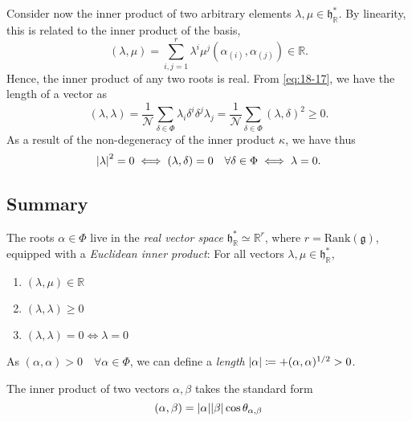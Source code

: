 Consider now the inner product of two arbitrary elements $\lambda, \mu \in \mathfrak{h}^*_{\mathbb{R}}$.
By linearity, this is related to the inner product of the basis,
\begin{equation}
  (\lambda ,\mu) = \sum_{i, j =1}^{r} \lambda^{i} \mu^{j} (\alpha_{(i)}, \alpha_{(j)}) \in \mathbb{R}.
\end{equation}
Hence, the inner product of any two roots is real.
From \eqref{eq:18-17}, we have the length of a vector as
\begin{equation}
  (\lambda, \lambda) = \frac{1}{\mathcal{N}} \sum_{\delta \in \Phi} \lambda_{i} \delta^{i} \delta^{j} \lambda_{j} = \frac{1}{\mathcal{N}} \sum_{\delta \in \Phi} (\lambda, \delta)^2 \geq 0.
\end{equation}
As a result of the non-degeneracy of the inner product $\kappa$, we have thus
\begin{equation}
  \abs{\lambda}^2 = 0 \iff (\lambda, \delta) = 0 \quad \forall \delta \in \Phi \iff \lambda = 0.
\end{equation}

\subsection*{Summary}%

The roots $\alpha \in \Phi$ live in the \emph{real vector space} $\mathfrak{h}^*_{\mathbb{R}} \simeq \mathbb{R}^r$, where $r = \text{Rank}(\mathfrak{g})$, equipped with a \emph{Euclidean inner product}:
For all vectors $\lambda, \mu \in \mathfrak{h}^*_{\mathbb{R}}$, 
\begin{enumerate}
  \item $(\lambda, \mu) \in \mathbb{R}$ 
  \item $(\lambda, \lambda) \geq 0$ 
  \item $(\lambda,  \lambda) = 0 \iff \lambda = 0$
\end{enumerate}

\begin{wrapfigure}{R}{0.3\columnwidth}
  \centering
  \def\svgwidth{0.25\columnwidth}
  
  \caption{}
  \label{fig:l18f1}
\end{wrapfigure}

\begin{definition}[]
  As $(\alpha, \alpha) > 0 \quad \forall \alpha \in \Phi$, we can define a \emph{length} $\abs{\alpha} \coloneqq + (\alpha, \alpha)^{1 / 2} > 0$.
\end{definition}
The inner product of two vectors $\alpha, \beta$ takes the standard form
\begin{equation}
  (\alpha, \beta) = \abs{\alpha} \abs{\beta} \cos\theta_{\alpha, \beta}
\end{equation}

